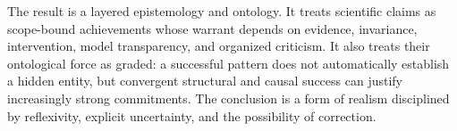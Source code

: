 \documentclass[11pt,openright]{book}
\begin{document}
The result is a layered epistemology and ontology. It treats scientific claims
as scope-bound achievements whose warrant depends on evidence, invariance,
intervention, model transparency, and organized criticism. It also treats
their ontological force as graded: a successful pattern does not automatically
establish a hidden entity, but convergent structural and causal success can
justify increasingly strong commitments. The conclusion is a form of realism
disciplined by reflexivity, explicit uncertainty, and the possibility of
correction.

\tableofcontents

\mainmatter















\backmatter
\setcounter{secnumdepth}{0}





\printindex
\end{document}
